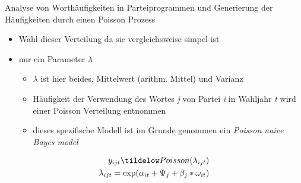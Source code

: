 \documentclass[11pt]{article}
\begin{document}
Analyse von Worthäufigkeiten in Parteiprogrammen und Generierung der Häufigkeiten durch einen Poisson Prozess
\begin{itemize}
\item Wahl dieser Verteilung da sie vergleichsweise simpel ist
\item nur ein Parameter \(\lambda\)
\begin{itemize}
\item \(\lambda\) ist hier beides, Mittelwert (arithm. Mittel) und Varianz
\end{itemize}
\begin{itemize}
\item Häufigkeit der Verwendung des Wortes \emph{j} von Partei \emph{i} in Wahljahr \emph{t} wird einer Poisson Verteilung entnommen
\item dieses spezifische Modell ist im Grunde genommen ein \emph{Poisson naive Bayes model}
\end{itemize}
\end{itemize}

\begin{equation*}
\begin{aligned}
y_{ijt} \tildelow Poisson (\lambda_{ijt})\\
\lambda_{ijt} = \text{exp}(\alpha_{it} + \Psi_{j} + \beta_{j} * \omega_{it})
\end{aligned}
\end{equation*}
\end{document}
